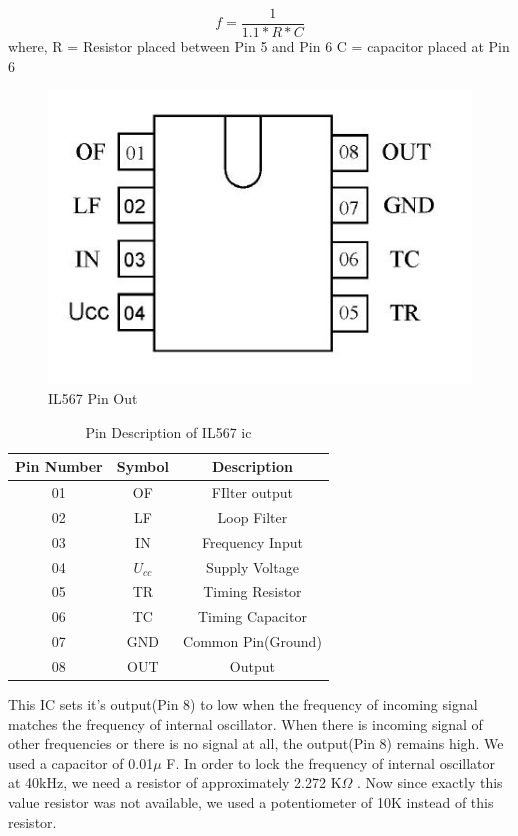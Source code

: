 \begin{equation}
	f=\frac{1}{1.1*R*C}
\end{equation}
where,
R = Resistor placed between Pin 5 and Pin 6
C = capacitor placed at Pin 6
\begin{figure}[h]
	\centering
	\includegraphics[scale=0.5]{Images/IL567PinOut.jpg}
	\caption{IL567 Pin Out}
	\label{fig:PinOut}
\end{figure}

\begin{table}[h!]
	\centering
	\begin{tabular}{|c|c|c|}
		\hline 
		\bf{Pin Number} & \bf{Symbol} & \bf{Description} \\ 
		\hline 
		01 & OF & FIlter output \\	
		02 & LF & Loop Filter \\
		03 & IN & Frequency Input \\	  
		04 & $U_{cc}$ & Supply Voltage \\	  
		05 & TR & Timing Resistor \\	  
		06 & TC & Timing Capacitor \\	  
		07 & GND & Common Pin(Ground) \\	  
		08 & OUT & Output \\ 
		\hline 
	\end{tabular} 
	\caption{Pin Description of IL567 \gls{ic}\cite{ToneDecoder}}
\end{table}

This IC sets it's output(Pin 8) to low when the frequency of incoming signal matches the frequency of internal oscillator. When there is incoming signal of other frequencies or there is no signal at all, the output(Pin 8) remains high. 
We used a capacitor of 0.01$\mu$ F. In order to lock the frequency of internal oscillator at 40kHz, we need a resistor of approximately 2.272 K$\Omega$ . Now since exactly this value resistor was not available, we used a potentiometer of 10K instead of this resistor. 

